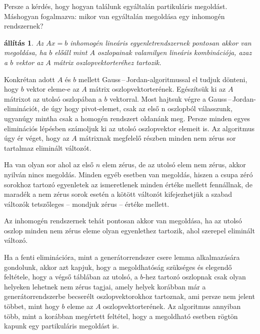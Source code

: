 \documentclass[9pt, a4paper, showtrims]{memoir}
\theoremstyle{plain}
\newtheorem{proposition}{állítás}[chapter]
\theoremstyle{remark}
\theoremstyle{definition}
\begin{document}
Persze a kérdés, hogy hogyan találunk egyáltalán partikuláris megoldást.
Máshogyan fogalmazva: mikor van egyáltalán megoldása egy inhomogén rendszernek?
\begin{proposition}
	Az $Ax=b$ inhomogén lineáris egyenletrendszernek pontosan akkor van megoldása,
	ha $b$ előáll mint $A$ oszlopainak valamilyen lineáris kombinációja,
	azaz a $b$ vektor az $A$ mátrix oszlopvektorteréhez tartozik.
\end{proposition}
Konkrétan adott $A$ és $b$ mellett Gauss\,--\,Jordan-algoritmussal  el tudjuk dönteni, hogy
$b$ vektor eleme-e az $A$ mátrix oszlopvektorterének.
Egészítsük ki az $A$ mátrixot az utolsó oszlopában a $b$ vektorral.
Most hajtsuk végre a Gauss\,--\,Jordan-eliminációt, de úgy hogy pivot-elemet,
csak az első n oszlopból válasszunk, ugyanúgy mintha csak a homogén rendszert oldanánk meg.
Persze minden egyes eliminációs lépésben számoljuk ki az utolsó oszlopvektor elemeit is.
Az algoritmus úgy ér véget,
hogy az $A$ mátrixnak megfelelő részben minden nem zérus sor tartalmaz eliminált változót.

Ha van olyan sor ahol az első $n$ elem zérus, de az utolsó elem nem zérus,
akkor nyilván nincs megoldás.
Minden egyéb esetben van megoldás,
hiszen a csupa zéró sorokhoz tartozó egyenletek az ismeretlenek minden értéke mellett fennállnak,
de maradék a nem zérus sorok esetén a kötött változót
kifejezhetjük a szabad változók tetszőleges -- mondjuk zérus -- értéke mellett.

Az inhomogén rendszernek tehát pontosan akkor van megoldása,
ha az utolsó oszlop minden nem zérus eleme olyan egyenlethez tartozik,
ahol szerepel eliminált változó.

Ha a fenti eliminációra, mint a generátorrendszer csere lemma alkalmazására gondolunk,
akkor azt kapjuk, hogy a megoldhatóság szükséges és elegendő feltétele,
hogy a végső táblában az utolsó, a $b$-hez tartozó oszlopnak csak olyan helyeken lehetnek nem zérus tagjai,
amely helyek korábban már a generátorrendszerbe becserélt oszlopvektorokhoz tartoznak,
ami persze nem jelent többet, mint hogy $b$ eleme az $A$ oszlopvektorterének.
Az algoritmus annyiban több, mint a korábban megértett feltétel,
hogy a megoldható esetben rögtön kapunk egy partikuláris megoldást is.
\end{document}
